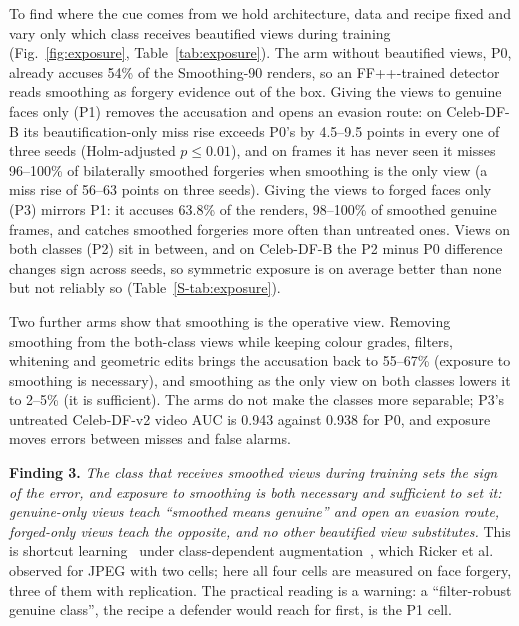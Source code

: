 \documentclass[conference]{IEEEtran}
\begin{document}
To find where the cue comes from we hold architecture, data and recipe fixed and vary only which class receives beautified
views during training (Fig.~\ref{fig:exposure}, Table~\ref{tab:exposure}). The arm without beautified views, P0, already
accuses 54\% of the Smoothing-90 renders, so an FF++-trained detector reads smoothing as forgery evidence out of the box.
Giving the views to genuine faces only (P1) removes the accusation and opens an evasion route: on Celeb-DF-B its
beautification-only miss rise exceeds P0's by 4.5--9.5 points in every one of three seeds (Holm-adjusted $p\le0.01$),
and on frames it has never seen it misses 96--100\% of bilaterally smoothed forgeries when smoothing is the only view
(a miss rise of 56--63 points on three seeds).
Giving the views to forged faces only (P3) mirrors P1: it accuses 63.8\% of the renders, 98--100\% of smoothed genuine
frames, and catches smoothed forgeries more often than untreated ones.
Views on both classes (P2) sit in between, and on Celeb-DF-B the P2 minus P0 difference changes sign across seeds, so
symmetric exposure is on average better than none but not reliably so (Table~\ref{S-tab:exposure}).

Two further arms show that smoothing is the operative view. Removing smoothing from the both-class views while keeping colour
grades, filters, whitening and geometric edits brings the accusation back to 55--67\%
(exposure to smoothing is necessary), and smoothing as the only view on both classes lowers it to 2--5\%
(it is sufficient). The arms do not make the classes more separable; P3's untreated Celeb-DF-v2 video AUC is 0.943 against
0.938 for P0, and exposure moves errors between misses and false alarms.

\textbf{Finding 3.} \emph{The class that receives smoothed views during training sets the sign of the error, and exposure
to smoothing is both necessary and sufficient to set it: genuine-only views teach ``smoothed means genuine'' and open an
evasion route, forged-only views teach the opposite, and no other beautified view substitutes.} This is shortcut
learning~\cite{geirhos2020} under class-dependent augmentation~\cite{balestriero2022}, which Ricker et
al.~\cite{ricker2026biasid} observed for JPEG with two cells; here all four cells are measured on face forgery, three of
them with replication. The practical reading is a warning: a ``filter-robust genuine class'', the recipe a defender would
reach for first, is the P1 cell.
\end{document}
